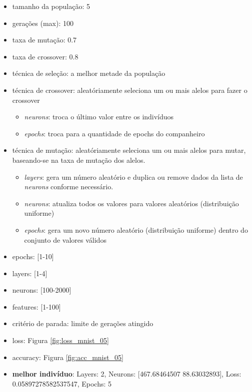 \documentclass[twoside,conference,a4paper]{IEEEtran}
\begin{document}
\begin{itemize}
    \item tamanho da população: 5
    \item gerações (max): 100
    \item taxa de mutação: 0.7
    \item taxa de crossover: 0.8
    \item técnica de seleção: a melhor metade da população
    \item técnica de crossover: aleatóriamente seleciona um ou mais alelos para fazer o crossover
    \begin{itemize}
        \item \emph{neurons}: troca o último valor entre os indivíduos
        \item \emph{epochs}: troca para a quantidade de epochs do companheiro
    \end{itemize}
    \item técnica de mutação: aleatóriamente seleciona um ou mais alelos para mutar, baseando-se na taxa de mutação dos alelos.
    \begin{itemize}
        \item \emph{layers}: gera um número aleatório e duplica ou remove dados da lista de \emph{neurons} conforme necessário.
        \item \emph{neurons}: atualiza todos os valores para valores aleatórios (distribuição uniforme)
        \item \emph{epochs}: gera um novo número aleatório (distribuição uniforme) dentro do conjunto de valores válidos
    \end{itemize}
    \item epochs: [1-10]
    \item layers: [1-4]
    \item neurons: [100-2000]
    \item features: [1-100]
    \item critério de parada: limite de gerações atingido
    \item loss: Figura \ref{fig:loss_mnist_05}
    \item accuracy: Figura \ref{fig:acc_mnist_05}
    \item \textbf{melhor indivíduo}: Layers: 2, Neurons: [467.68464507  88.63032893], Loss: 0.05897278582537547, Epochs: 5
\end{itemize}
\end{document}
